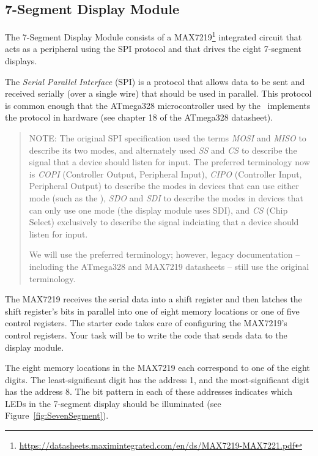 \subsection{7-Segment Display Module}

The 7-Segment Display Module consists of a
MAX7219\footnote{\url{https://datasheets.maximintegrated.com/en/ds/MAX7219-MAX7221.pdf}}
integrated circuit that acts as a peripheral using the SPI protocol and that
drives the eight 7-segment displays.

The \textit{Serial Parallel Interface} (SPI) is a protocol that allows data to
be sent and received serially (over a single wire) that should be used in
parallel. This protocol is common enough that the ATmega328 microcontroller
used by the \nano\ implements the protocol in hardware (see chapter 18 of the
ATmega328 datasheet).

    \begin{quote}
    NOTE: The original SPI specification used the terms \textit{MOSI} and
    \textit{MISO} to describe its two modes, and alternately used \textit{SS}
    and \textit{CS} to describe the signal that a device should listen for
    input. The preferred terminology now is \textit{COPI} (Controller Output,
    Peripheral Input), \textit{CIPO} (Controller Input, Peripheral Output) to
    describe the modes in devices that can use either mode (such as the \nano),
    \textit{SDO} and \textit{SDI} to describe the modes in devices that can
    only use one mode (the display module uses SDI), and \textit{CS} (Chip
    Select) exclusively to describe the signal indciating that a device should
    listen for input.

    We will use the preferred terminology; however, legacy documentation --
    including the ATmega328 and MAX7219 datasheets -- still use the original
    terminology.
    \end{quote}

The MAX7219 receives the serial data into a shift register and then latches the
shift register's bits in parallel into one of eight memory locations or one of
five control registers. The starter code takes care of configuring the
MAX7219's control registers. Your task will be to write the code that sends
data to the display module.

The eight memory locations in the MAX7219 each correspond to one of the eight
digits. The least-significant digit has the address 1, and the most-significant
digit has the address 8. The bit pattern in each of these addresses indicates
which LEDs in the 7-segment display should be illuminated (see
Figure~\ref{fig:SevenSegment}).


